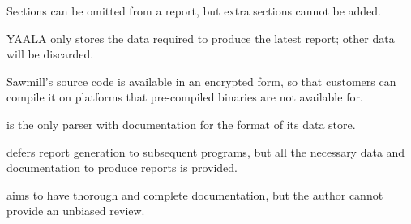 \begin{table}[thbp]
    \begin{eqlist}

        \item [\dag{}] Sections can be omitted from a report, but extra
            sections cannot be added.

        \item [\ddag{}] YAALA only stores the data required to produce the
            latest report; other data will be discarded.

        \item [\nialpha{}] Sawmill's source code is available in an
            encrypted form, so that customers can compile it on platforms
            that pre-compiled binaries are not available for.

        \item [\nibeta{}] \parsername{} is the only parser with
            documentation for the format of its data store.

        \item [\nichi{}] \parsername{} defers report generation to
            subsequent programs, but all the necessary data and
            documentation to produce reports is provided.

        \item [\niepsilon{}] \parsername{} aims to have thorough and
            complete documentation, but the author cannot provide an
            unbiased review.

    \end{eqlist}

\end{table}

\clearpage{}
